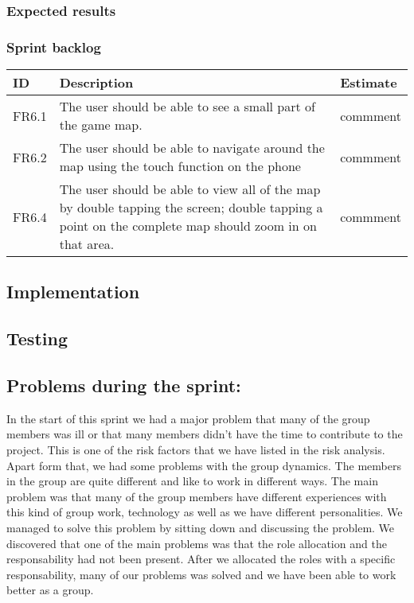 \subsubsection{Expected results}


\subsubsection{Sprint backlog}
\begin{tabular}{| p{1cm} | p{8cm} | p{3cm} |}
	\hline
	ID & Description & Estimate \\ \hline
	FR6.1 & The user should be able to see a small part of the game map. & commment \\ \hline
	FR6.2 & The user should be able to navigate around the map using the touch function on the phone & commment \\ \hline
	FR6.4 & The user should be able to view all of the map by double tapping the screen; double tapping a point on the complete map should zoom in on that area. & commment \\
	\hline
\end{tabular}

\subsection{Implementation}

\subsection{Testing}

\subsection{Problems during the sprint:}
In the start of this sprint we had a major problem that many of the group members was ill or 
that many members didn't have the time to contribute to the project. This is one of the risk factors 
that we have listed in the risk analysis. 
Apart form that, we had some problems with the group dynamics. The members in the group are 
quite different and like to work in different ways. The main problem was that many of the group members
have different experiences with this kind of group work, technology as well as we have 
different personalities.
We managed to solve this problem by sitting down and discussing the problem. We discovered that
one of the main problems was that the role allocation and the responsability had not been present.
After we allocated the roles with a specific responsability, many of our problems was solved and
we have been able to work better as a group.

